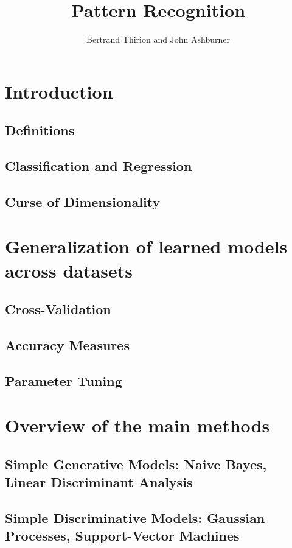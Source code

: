 \documentclass{beamer}
\title{Pattern Recognition}
\author{Bertrand Thirion and John Ashburner}
\date{}
\begin{document}
\begin{frame}
\titlepage
\end{frame}

\section{Introduction}
    \subsection{Definitions}

    \subsection{Classification and Regression}                               
    \subsection{Curse of Dimensionality}                                     
\section{Generalization of learned models across datasets}
    \subsection{Cross-Validation}                                            
    \subsection{Accuracy Measures}                                           
    \subsection{Parameter Tuning}                                            
\section{Overview of the main methods}
    \subsection{Simple Generative Models: Naive Bayes, Linear Discriminant Analysis}       
    \subsection{Simple Discriminative Models: Gaussian Processes, Support-Vector Machines} 
\end{document}
